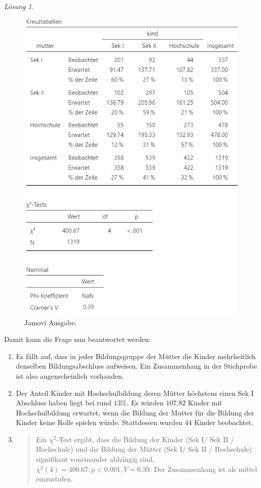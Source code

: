 \documentclass[
]{book}
\theoremstyle{definition}
\theoremstyle{definition}
\theoremstyle{definition}
\theoremstyle{definition}
\theoremstyle{remark}
\newtheorem*{solution}{Lösung}
\begin{document}
\begin{solution}
\begin{figure}
{\centering \includegraphics{figures/10-exr-edu-heredity-jmv-output} 

}

\caption{Jamovi Ausgabe.}\label{fig:sol-edu-heredity-output}
\end{figure}

Damit kann die Frage nun beantwortet werden:

\begin{enumerate}
\def\labelenumi{\alph{enumi})}
\item
  Es fällt auf, dass in jeder Bildungsgruppe der Mütter die Kinder mehrheitlich denselben Bildungsabschluss aufweisen. Ein Zusammenhang in der Stichprobe ist also augenscheinlich vorhanden.
\item
  Der Anteil Kinder mit Hochschulbildung deren Mütter höchstens einen Sek I Abschluss haben liegt bei rund \(13\%\). Es würden \(107.82\) Kinder mit Hochschulbildung erwartet, wenn die Bildung der Mutter für die Bildung der Kinder keine Rolle spielen würde. Stattdessen wurden \(44\) Kinder beobachtet.
\item
  \begin{quote}
  Ein \(\chi^2\)-Test ergibt, dass die Bildung der Kinder (Sek I/ Sek II / Hochschule) und die Bildung der Mütter (Sek I/ Sek II / Hochschule) signifikant voneinander abhängig sind,
  \(\chi^2 (4) = 400.67, p < 0.001, V = 0.39\). Der Zusammenhang ist als mittel einzustufen.
  \end{quote}
\end{enumerate}

\end{solution}
\end{document}
